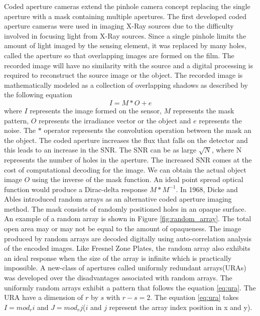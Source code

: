 Coded aperture cameras extend the pinhole camera concept replacing the single aperture with a mask containing multiple apertures. The first developed coded aperture cameras were used in imaging X-Ray sources due to the difficulty involved in focusing light from X-Ray sources\cite{Cannon1}. Since a single pinhole limits the amount of light imaged by the sensing element, it was replaced by many holes, called the aperture so that overlapping images are formed on the film. The recorded image will have no similarity with the source and a digital processing is required to reconstruct the source image or the object. The recorded image is mathematically modeled as a  collection of overlapping shadows as described by the following equation\cite{VBoomi}\cite{Cannon1} 
\begin{equation}
I = M * O + e
\label{eq:conv}
\end{equation}
where $I$ represents the image formed on the sensor, $M$ represents the mask pattern, $O$ represents the irradiance vector or the object and $e$ represents the noise. The $*$ operator represents the convolution operation between the mask an the object. The coded aperture increases the flux that falls on the detector and this leads to an increase in the SNR. The SNR can be as large $\sqrt{N}$, where N represents the number of holes in the aperture\cite{Cannon1}. The increased SNR comes at the cost of computational decoding for the image. We can obtain the actual object image $O$ using the inverse of the mask function. An ideal point spread optical function would produce a Dirac-delta response $M * M^{-1}$.
In 1968, Dicke and Ables\cite{Cannon1} introduced random arrays as an alternative coded aperture imaging method. The mask consists of randomly positioned holes in an opaque surface. An example of a random array is shown in Figure \ref{fig:random_array}. The total open area may or may not be equal to the amount of opaqueness. The image produced by random arrays are decoded digitally using auto-correlation analysis of the encoded images\cite{Cannon1}. Like Fresnel Zone Plates, the random array also exhibits an ideal response when the size of the array is infinite which is practically impossible. A new-class of apertures called uniformly redundant arrays(URAs) was developed over the disadvantages associated with random arrays. The uniformly random arrays exhibit a pattern that follows the equation \ref{eq:ura}\cite{Fenimore:78}. The URA have a dimension of $r$ by $s$ with $r - s = 2$. The equation \ref{eq:ura} takes $I  = mod_ri$ and $J  = mod_rj$($i$ and $j$ represent the array index position in x and y).
